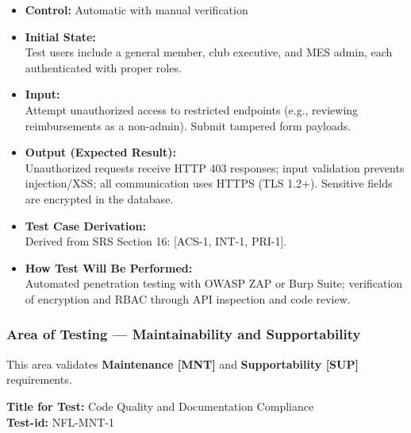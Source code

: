 \documentclass[12pt, titlepage]{article}
\begin{document}
\begin{itemize}
    \item \textbf{Control:} Automatic with manual verification
    \item \textbf{Initial State:} \\
    Test users include a general member, club executive, and MES admin, each authenticated with proper roles.
    \item \textbf{Input:} \\
    Attempt unauthorized access to restricted endpoints (e.g., reviewing reimbursements as a non-admin). Submit tampered form payloads.
    \item \textbf{Output (Expected Result):} \\
    Unauthorized requests receive HTTP 403 responses; input validation prevents injection/XSS; all communication uses HTTPS (TLS 1.2+). Sensitive fields are encrypted in the database.
    \item \textbf{Test Case Derivation:} \\
    Derived from SRS Section 16: [ACS-1, INT-1, PRI-1].
    \item \textbf{How Test Will Be Performed:} \\
    Automated penetration testing with OWASP ZAP or Burp Suite; verification of encryption and RBAC through API inspection and code review.
\end{itemize}

\subsubsection{Area of Testing — Maintainability and Supportability}

This area validates \textbf{Maintenance [MNT]} and \textbf{Supportability [SUP]} requirements.

\textbf{Title for Test:} Code Quality and Documentation Compliance \\
\textbf{Test-id:} NFL-MNT-1
\end{document}
